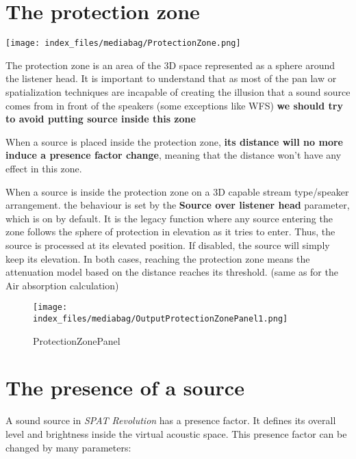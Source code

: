 \documentclass[
  letterpaper,
  DIV=11,
  numbers=noendperiod]{scrreport}
\begin{document}
\hypertarget{the-protection-zone}{%
\section{The protection zone}\label{the-protection-zone}}

\texttt{[image: index\_files/mediabag/ProtectionZone.png]}

The protection zone is an area of the 3D space represented as a sphere
around the listener head. It is important to understand that as most of
the pan law or spatialization techniques are incapable of creating the
illusion that a sound source comes from in front of the speakers (some
exceptions like WFS) \textbf{we should try to avoid putting source
inside this zone}

When a source is placed inside the protection zone, \textbf{its distance
will no more induce a presence factor change}, meaning that the distance
won't have any effect in this zone.

When a source is inside the protection zone on a 3D capable stream
type/speaker arrangement. the behaviour is set by the \textbf{Source
over listener head} parameter, which is on by default. It is the legacy
function where any source entering the zone follows the sphere of
protection in elevation as it tries to enter. Thus, the source is
processed at its elevated position. If disabled, the source will simply
keep its elevation. In both cases, reaching the protection zone means
the attenuation model based on the distance reaches its threshold. (same
as for the Air absorption calculation)

\begin{figure}

{\centering \texttt{[image: index\_files/mediabag/OutputProtectionZonePanel1.png]}

}

\caption{ProtectionZonePanel}

\end{figure}

\hypertarget{the-presence-of-a-source}{%
\section{The presence of a source}\label{the-presence-of-a-source}}

A sound source in \emph{SPAT Revolution} has a presence factor. It
defines its overall level and brightness inside the virtual acoustic
space. This presence factor can be changed by many parameters:
\end{document}
